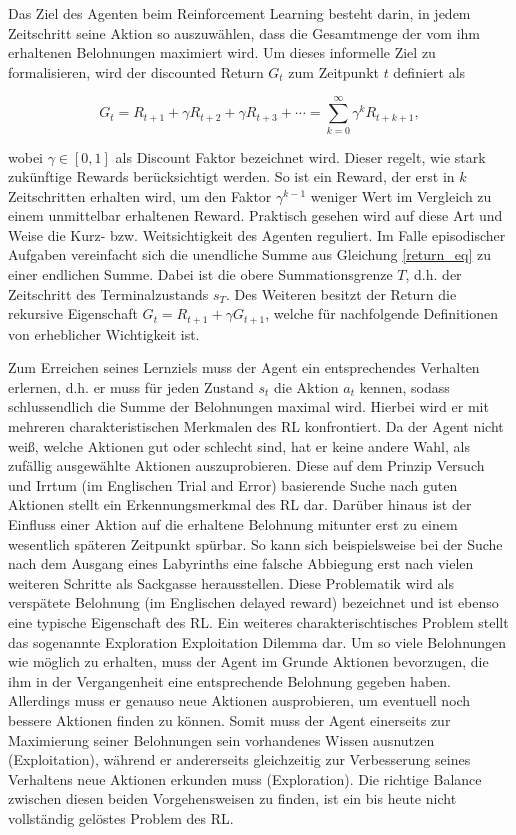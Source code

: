 Das Ziel des Agenten beim Reinforcement Learning besteht darin, in jedem Zeitschritt seine Aktion so auszuwählen, dass die Gesamtmenge der vom ihm erhaltenen Belohnungen maximiert wird. Um dieses informelle Ziel zu formalisieren, wird der discounted Return $G_t$ zum Zeitpunkt $t$ definiert als

\begin{equation}
  G_t = R_{t+1} + \gamma R_{t+2} + \gamma R_{t+3} + \dotsb = \sum_{k=0}^{\infty} \gamma^k R_{t+k+1},
  \label{return_eq}
\end{equation}

wobei $\gamma \in [0, 1]$ als Discount Faktor bezeichnet wird. Dieser regelt, wie stark zukünftige Rewards berücksichtigt werden. So ist ein Reward, der erst in $k$ Zeitschritten erhalten wird, um den Faktor $\gamma^{k-1}$ weniger Wert im Vergleich zu einem unmittelbar erhaltenen Reward. Praktisch gesehen wird auf diese Art und Weise die Kurz- bzw. Weitsichtigkeit des Agenten reguliert. Im Falle episodischer Aufgaben vereinfacht sich die unendliche Summe aus Gleichung \eqref{return_eq} zu einer endlichen Summe. Dabei ist die obere Summationsgrenze $T$, d.h. der Zeitschritt des Terminalzustands $s_T$. Des Weiteren besitzt der Return die rekursive Eigenschaft $G_t = R_{t+1} + \gamma G_{t+1}$, welche für nachfolgende Definitionen von erheblicher Wichtigkeit ist.

Zum Erreichen seines Lernziels muss der Agent ein entsprechendes Verhalten erlernen, d.h. er muss für jeden Zustand $s_t$ die Aktion $a_t$ kennen, sodass schlussendlich die Summe der Belohnungen maximal wird. Hierbei wird er mit mehreren charakteristischen Merkmalen des RL konfrontiert. Da der Agent nicht weiß, welche Aktionen gut oder schlecht sind, hat er keine andere Wahl, als zufällig ausgewählte Aktionen auszuprobieren. Diese auf dem Prinzip Versuch und Irrtum (im Englischen Trial and Error) basierende Suche nach guten Aktionen stellt ein Erkennungsmerkmal des RL dar. Darüber hinaus ist der Einfluss einer Aktion auf die erhaltene Belohnung mitunter erst zu einem wesentlich späteren Zeitpunkt spürbar. So kann sich beispielsweise bei der Suche nach dem Ausgang eines Labyrinths eine falsche Abbiegung erst nach vielen weiteren Schritte als Sackgasse herausstellen. Diese Problematik wird als verspätete Belohnung (im Englischen delayed reward) bezeichnet und ist ebenso eine typische Eigenschaft des RL. Ein weiteres charakterischtisches Problem stellt das sogenannte Exploration Exploitation Dilemma dar. Um so viele Belohnungen wie möglich zu erhalten, muss der Agent im Grunde Aktionen bevorzugen, die ihm in der Vergangenheit eine entsprechende Belohnung gegeben haben. Allerdings muss er genauso neue Aktionen ausprobieren, um eventuell noch bessere Aktionen finden zu können. Somit muss der Agent einerseits zur Maximierung seiner Belohnungen sein vorhandenes Wissen ausnutzen (Exploitation), während er andererseits gleichzeitig zur Verbesserung seines Verhaltens neue Aktionen erkunden muss (Exploration). Die richtige Balance zwischen diesen beiden Vorgehensweisen zu finden, ist ein bis heute nicht vollständig gelöstes Problem des RL.

